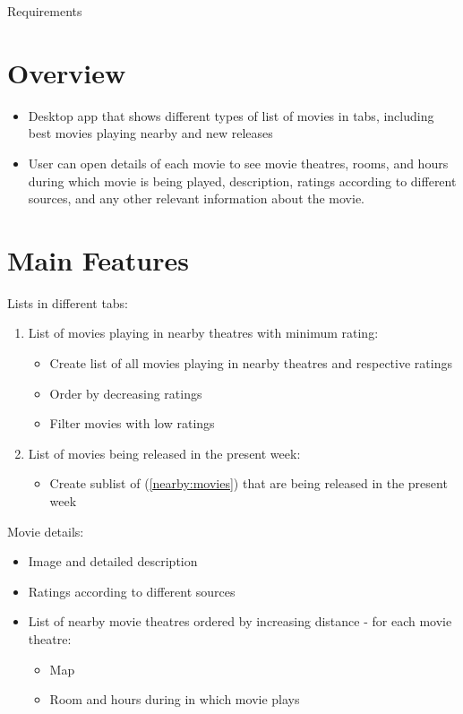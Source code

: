 \documentclass[letterpaper]{article}
\begin{document}
\begin{center}

\huge{Requirements}

\end{center}

\vspace{0.25in}

\section{Overview}

\begin{itemize}
	\item Desktop app that shows different types of list of movies in tabs, including best movies playing nearby and new releases	
		
	\item User can open details of each movie to see movie theatres, rooms, and hours during which movie is being played, description,
	ratings according to different sources, and any other relevant information about the movie.
\end{itemize}


\section{Main Features}

Lists in different tabs:
\begin{enumerate}
	\item List of movies playing in nearby theatres with minimum rating:
	\label{nearby:movies}
	\begin{itemize}
		\item Create list of all movies playing in nearby theatres and respective ratings
		\item Order by decreasing ratings
		\item Filter movies with low ratings
	\end{itemize}
	
	\item List of movies being released in the present week:
	\begin{itemize}
		\item Create sublist of (\ref{nearby:movies}) that are being released in the present week
	\end{itemize}
\end{enumerate}

Movie details:
\begin{itemize}
	\item Image and detailed description
	\item Ratings according to different sources
	\item List of nearby movie theatres ordered by increasing distance - for each movie theatre:
	\begin{itemize}
	    \item Map
		\item Room and hours during in which movie plays
	\end{itemize}
\end{itemize}
\end{document}
